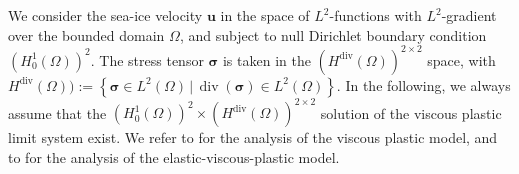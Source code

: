 \documentclass[11pt]{article}
\newcommand{\bu}{\mathbf{u}}
\newcommand{\sig}{\boldsymbol{\sigma}}
\begin{document}

We consider the sea-ice velocity $\bu$ in the space of $L^2$-functions with $L^2$-gradient over the bounded domain $\Omega$, and subject to null Dirichlet boundary condition $(H^1_0(\Omega))^2$. The stress tensor $\sig$ is taken in the $(H^{\operatorname{div}}(\Omega))^{2\times2}$ space, with $H^{\operatorname{div}}(\Omega)):=\left \{ \sig \in L^2(\Omega)\, | \, \operatorname{div}(\sig) \in L^2(\Omega) \right \}$. In the following, we always assume that the $(H^1_0(\Omega))^2 \times (H^{\operatorname{div}}(\Omega))^{2\times2}$ solution of the viscous plastic limit system exist. We refer to \cite{liu2022well, brandt2022rigorous} for the analysis of the viscous plastic model, and to \cite{boutros2026global} for the analysis of the elastic-viscous-plastic model.
\end{document}
